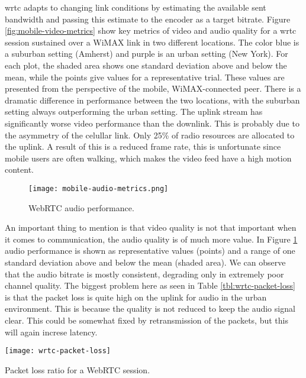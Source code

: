 \gls{wrtc} adapts to changing link conditions by estimating the available sent bandwidth and passing this estimate to the encoder as a target bitrate. Figure \ref{fig:mobile-video-metrics} show key metrics of video and audio quality for a \gls{wrtc} session sustained over a WiMAX link in two different locations. The color blue is a suburban setting (Amherst) and purple is an urban setting (New York). For each plot, the shaded area shows one standard deviation above and below the mean, while the points give values for a representative trial. These values are presented from the perspective of the mobile, WiMAX-connected peer. There is a dramatic difference in performance between the two locations, with the suburban setting always outperforming the urban setting. The uplink stream has significantly worse video performance than the downlink. This is probably due to the asymmetry of the celullar link. Only 25\% of radio resources are allocated to the uplink\cite{fund2013performance}. A result of this is a reduced frame rate, this is unfortunate since mobile users are often walking, which makes the video feed have a high motion content.

\pagebreak
\begin{figure}[here]
\centerline{\texttt{[image: mobile-audio-metrics.png]}}
\caption{WebRTC audio performance\cite{fund2013performance}.}
\label{fig:mobile-audio-metrics}
\end{figure}

An important thing to mention is that video quality is not that important when it comes to communication, the audio quality is of much more value\cite{fund2013performance}. In Figure \ref{fig:mobile-audio-metrics} audio performance is shown as representative values (points) and a range of one standard deviation above and below the mean (shaded area). We can observe that the audio bitrate is mostly consistent, degrading only in extremely poor channel quality. The biggest problem here as seen in Table \ref{tbl:wrtc-packet-loss} is that the packet loss is quite high on the uplink for audio in the urban environment. This is because the quality is not reduced to keep the audio signal clear. This could be somewhat fixed by retransmission of the packets, but this will again increse latency.
\\
\begin{table}[here]
\centerline{\texttt{[image: wrtc-packet-loss]}}
\caption{Packet loss ratio for a WebRTC session\cite{fund2013performance}.}
\label{tbl:wrtc-packet-loss}
\end{table}

